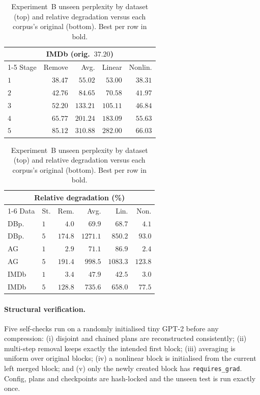 \documentclass[10pt,a4paper]{article}
\begin{document}
\begin{table}[t]
\vspace{0.6em}
\begin{minipage}[t]{0.48\textwidth}
\centering
\begin{tabular}{lrrrr}
\toprule
\multicolumn{5}{c}{\textbf{IMDb} (orig.\ $37.20$)}\\
\cmidrule(lr){1-5}
Stage & Remove & Avg. & Linear & Nonlin. \\
\midrule
$1$ & $38.47$ & $55.02$ & $53.00$ & $\mathbf{38.31}$ \\
$2$ & $42.76$ & $84.65$ & $70.58$ & $\mathbf{41.97}$ \\
$3$ & $52.20$ & $133.21$& $105.11$& $\mathbf{46.84}$ \\
$4$ & $65.77$ & $201.24$& $183.09$& $\mathbf{55.63}$ \\
$5$ & $85.12$ & $310.88$& $282.00$& $\mathbf{66.03}$ \\
\bottomrule
\end{tabular}
\end{minipage}\hfill
\begin{minipage}[t]{0.48\textwidth}
\centering
\begin{tabular}{llrrrr}
\toprule
\multicolumn{6}{c}{\textbf{Relative degradation (\%)}}\\
\cmidrule(lr){1-6}
Data & St. & Rem. & Avg. & Lin. & Non. \\
\midrule
DBp. & $1$ & $\mathbf{4.0}$ & $69.9$ & $68.7$ & $4.1$ \\
DBp. & $5$ & $174.8$ & $1271.1$ & $850.2$ & $\mathbf{93.0}$ \\
AG & $1$ & $2.9$ & $71.1$ & $86.9$ & $\mathbf{2.4}$ \\
AG & $5$ & $191.4$ & $998.5$ & $1083.3$ & $\mathbf{123.8}$ \\
IMDb & $1$ & $3.4$ & $47.9$ & $42.5$ & $\mathbf{3.0}$ \\
IMDb & $5$ & $128.8$ & $735.6$ & $658.0$ & $\mathbf{77.5}$ \\
\bottomrule
\end{tabular}
\end{minipage}
\caption{Experiment~B unseen perplexity by dataset (top) and relative
degradation versus each corpus's original (bottom). Best per row in bold.}
\label{tab:matrices}
\end{table}

\paragraph{Structural verification.} Five self-checks run on a randomly
initialised tiny GPT-2 before any compression: (i) disjoint and chained plans
are reconstructed consistently; (ii) multi-step removal keeps exactly the
intended first block; (iii) averaging is uniform over original blocks; (iv) a
nonlinear block is initialised from the current left merged block; and (v) only
the newly created block has \texttt{requires\_grad}. Config, plans and
checkpoints are hash-locked and the unseen test is run exactly once.
\end{document}
